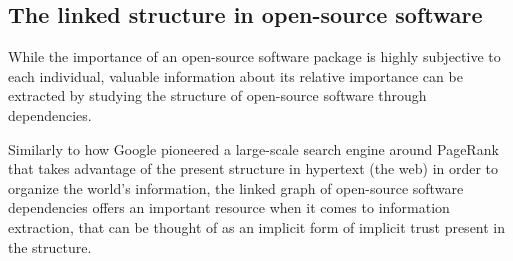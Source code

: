 
\subsection{The linked structure in open-source software}


While the importance of an open-source software package is highly subjective to
each individual, valuable information about its relative importance can be
extracted by studying the structure of open-source software through
dependencies.

Similarly to how Google pioneered a large-scale search engine around PageRank
that takes advantage of the present structure in hypertext (the web) in order
to organize the world’s information, the linked graph of open-source software
dependencies offers an important resource when it comes to information
extraction, that can be thought of as an implicit form of implicit trust
present in the structure.

